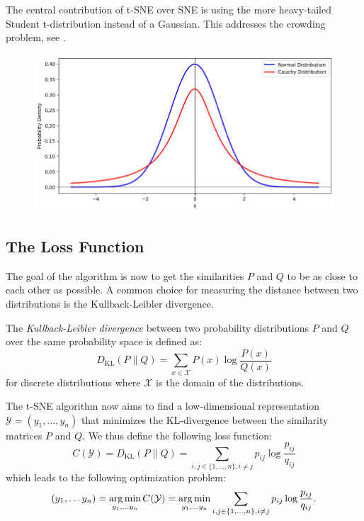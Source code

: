 The central contribution of t-SNE over SNE is using the more heavy-tailed Student t-distribution instead of a Gaussian. 
This addresses the crowding problem, see \cite{vdMaa08}. 

\begin{figure}[h]
    \begin{center}
        \includegraphics[width=0.9\linewidth]{Gaussian_Cauchy.png}
    \end{center}
\end{figure}

\subsection{The Loss Function}
The goal of the algorithm is now to get the similarities $P$ and $Q$ to be as close to each other as possible. 
A common choice for measuring the distance between two distributions is the Kullback-Leibler divergence. 

\begin{defi}
    The \emph{Kullback-Leibler divergence} between two probability distributions $P$ and $Q$ over the same probability space is defined as:
    \[
    D_{\text{KL}}(P \parallel Q) = \sum_{x \in \mathcal{X}} P(x) \log\frac{P(x)}{Q(x)}
    \]
    for discrete distributions where \(\mathcal{X}\) is the domain of the distributions.
\end{defi}

The t-SNE algorithm now aims to find a low-dimensional representation $\mathcal{Y} = (y_1, \dots, y_n)$ that minimizes the KL-divergence between the similarity matrices $P$ and $Q$. We thus define the following loss function: 
\begin{equation}
    C(\mathcal{Y}) = D_{\text{KL}}(P \parallel Q) = \sum_{i,j \in \{1,\dots,n\}, i \neq j} p_{ij} \log \frac{p_{ij}}{q_{ij}}
\end{equation}
which leads to the following optimization problem: 
\begin{equation}
    (y_1, \dots y_n) = \operatorname*{arg\,min}_{y_1, \dots y_n} C(\mathcal{Y}) = \operatorname*{arg\,min}_{y_1, \dots y_n} \sum_{i,j \in \{1,\dots,n\}, i \neq j} p_{ij} \log \frac{p_{ij}}{q_{ij}}.
\end{equation}


